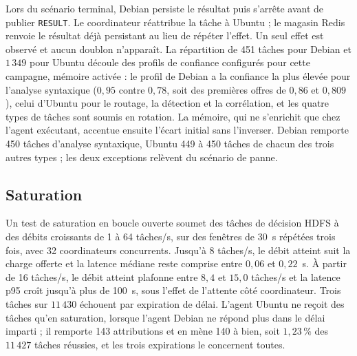 Lors du scénario terminal, Debian persiste le résultat puis s’arrête avant de publier \texttt{RESULT}. Le coordinateur réattribue la tâche à Ubuntu ; le magasin Redis renvoie le résultat déjà persistant au lieu de répéter l’effet. Un seul effet est observé et aucun doublon n’apparaît. La répartition de 451 tâches pour Debian et $1\,349$ pour Ubuntu découle des profils de confiance configurés pour cette campagne, mémoire activée : le profil de Debian a la confiance la plus élevée pour l'analyse syntaxique ($0{,}95$ contre $0{,}78$, soit des premières offres de $0{,}86$ et $0{,}809$), celui d'Ubuntu pour le routage, la détection et la corrélation, et les quatre types de tâches sont soumis en rotation. La mémoire, qui ne s'enrichit que chez l'agent exécutant, accentue ensuite l'écart initial sans l'inverser. Debian remporte 450 tâches d'analyse syntaxique, Ubuntu 449 à 450 tâches de chacun des trois autres types ; les deux exceptions relèvent du scénario de panne.

\subsection{Saturation}

Un test de saturation en boucle ouverte soumet des tâches de décision HDFS à des débits croissants de 1 à 64 tâches/s, sur des fenêtres de 30~s répétées trois fois, avec 32 coordinateurs concurrents. Jusqu'à 8 tâches/s, le débit atteint suit la charge offerte et la latence médiane reste comprise entre $0{,}06$ et $0{,}22$~s. À partir de 16 tâches/s, le débit atteint plafonne entre $8{,}4$ et $15{,}0$ tâches/s et la latence p95 croît jusqu'à plus de 100~s, sous l'effet de l'attente côté coordinateur. Trois tâches sur $11\,430$ échouent par expiration de délai. L'agent Ubuntu ne reçoit des tâches qu'en saturation, lorsque l'agent Debian ne répond plus dans le délai imparti ; il remporte 143 attributions et en mène 140 à bien, soit $1{,}23\,\%$ des $11\,427$ tâches réussies, et les trois expirations le concernent toutes.

